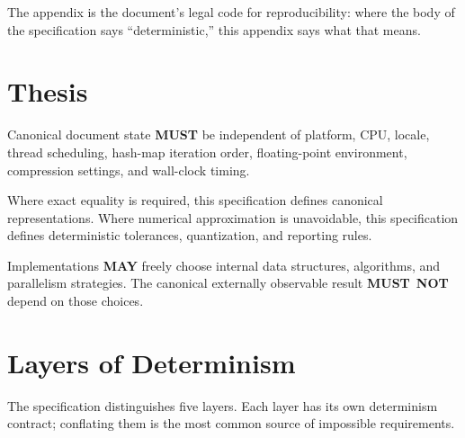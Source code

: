 \documentclass[11pt,letterpaper]{report}
\newcounter{requirement}[chapter]
\newcommand{\MUST}{\textbf{MUST}}
\newcommand{\MUSTNOT}{\textbf{MUST}\nobreak\ \textbf{NOT}}
\newcommand{\MAY}{\textbf{MAY}}
\begin{document}
The appendix is the document's legal code for reproducibility:
where the body of the specification says ``deterministic,'' this
appendix says what that means.

\section{Thesis}
\label{sec:det:thesis}

\begin{requirement}
  \label{req:determinism:platform-independent-state}
  Canonical document state \MUST{} be independent of platform,
  CPU, locale, thread scheduling, hash-map iteration order,
  floating-point environment, compression settings, and
  wall-clock timing.

  Where exact equality is required, this specification defines
  canonical representations. Where numerical approximation is
  unavoidable, this specification defines deterministic
  tolerances, quantization, and reporting rules.

  Implementations \MAY{} freely choose internal data structures,
  algorithms, and parallelism strategies. The canonical externally
  observable result \MUSTNOT{} depend on those choices.
\end{requirement}

\section{Layers of Determinism}
\label{sec:det:layers}

The specification distinguishes five layers. Each layer has its
own determinism contract; conflating them is the most common
source of impossible requirements.
\end{document}
